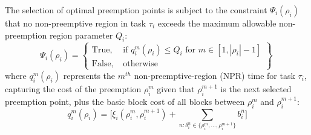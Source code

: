 %
\noindent
The selection of optimal preemption points is subject to the constraint \begin{math}\Psi_{i}(\rho_{i})\end{math} that no non-preemptive region in task \begin{math}\tau_{i}\end{math} exceeds the maximum allowable non-preemption region parameter \begin{math}Q_{i}\end{math}:
\begin{equation}\label{eqn:global-pp-constraint}
   \Psi_{i}(\rho_{i}) =
\left\{
\begin{array}{lr}
    \textrm{True, }&\textrm{if } q_{i}^{m}(\rho_{i}) \leq Q_{i} \textrm{ for } m \in [1,|\rho_{i}|-1] \\
    \textrm{False, }&\textrm{otherwise}
\end{array}
\right\}~
\end{equation}
%
\noindent
where \begin{math}q_{i}^{m}(\rho_{i})\end{math} represents the \begin{math}m^{th}\end{math} non-preemptive-region (NPR) time for task \begin{math}\tau_{i}\end{math}, capturing the cost of the preemption $\rho_i^m$ given that $\rho_i^{m+1}$ is the next selected preemption point, plus the basic block cost of all blocks between $\rho_i^m$ and $\rho_i^{m+1}$:
\begin{equation}\label{eqn:global-mthnpr-time}
   q_{i}^{m}(\rho_{i}) = \Big[\xi_{i}(\rho_{i}^{m},\rho_{i}^{m+1}) +
   \sum_{n: \delta_i^n \in \{\rho_i^m,\ldots, \rho_i^{m+1}\}} b_{i}^{n}\Big]
\end{equation}
\noindent
